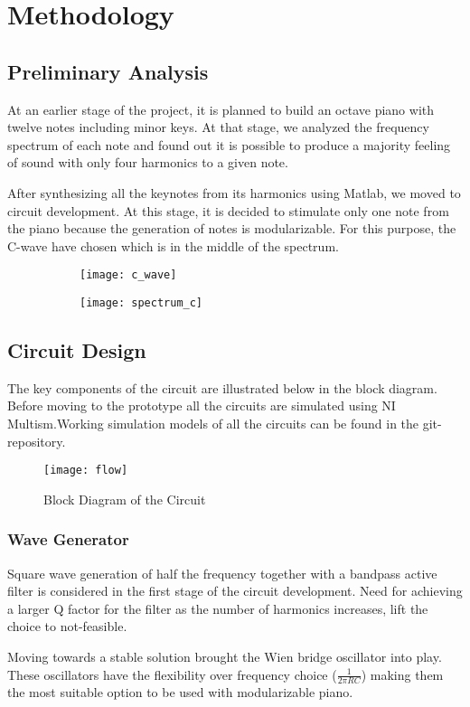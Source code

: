 \section{Methodology}
\subsection{Preliminary Analysis}
At an earlier stage of the project, it is planned to build an octave piano with twelve notes including minor keys. At that stage, we analyzed the frequency spectrum of each note and found out it is possible to produce a majority feeling of sound with only four harmonics to a given note.
\par
After synthesizing all the keynotes from its harmonics using Matlab, we moved to circuit development. At this stage, it is decided to stimulate only one note from the piano because the generation of notes is modularizable. For this purpose, the C-wave have chosen  which is in the middle of the spectrum.
\begin{figure}[h]
    \centering
    \begin{subfigure}{.9\columnwidth}
        \centering
        \texttt{[image: c\_wave]}
    \end{subfigure}
    \newline
    \begin{subfigure}{.9\columnwidth}
        \centering
        \texttt{[image: spectrum\_c]}
    \end{subfigure}

\end{figure}
\subsection{Circuit Design}
The key components of the circuit are illustrated below in the block diagram. Before moving to the prototype all the circuits are simulated using NI Multism.Working simulation models of all the circuits can be found in the git-repository.
\begin{figure}[h]
    \begin{center}
        \texttt{[image: flow]}
        \caption*{Block Diagram of the Circuit}
    \end{center}
\end{figure}
\subsubsection{Wave Generator}
Square wave generation of half the frequency together with a bandpass active filter is considered in the first stage of the circuit development. Need for achieving a larger Q factor for the filter as the number of harmonics increases, lift the choice to not-feasible.
\par
Moving towards a stable solution brought the Wien bridge oscillator into play. These oscillators have the flexibility over frequency choice ($\frac{1}{2\pi RC}$) making them the most suitable option to be used with modularizable piano.
